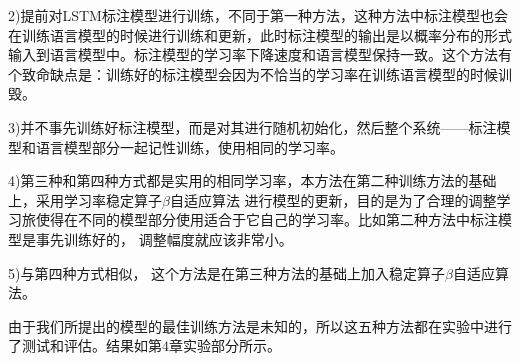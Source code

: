 2)提前对LSTM标注模型进行训练，不同于第一种方法，这种方法中标注模型也会在训练语言模型的时候进行训练和更新，此时标注模型的输出是以概率分布的形式输入到语言模型中。标注模型的学习率下降速度和语言模型保持一致。这个方法有个致命缺点是：训练好的标注模型会因为不恰当的学习率在训练语言模型的时候训毁。

3)并不事先训练好标注模型，而是对其进行随机初始化，然后整个系统——标注模型和语言模型部分一起记性训练，使用相同的学习率。 


4)第三种和第四种方式都是实用的相同学习率，本方法在第二种训练方法的基础上，采用学习率稳定算子$\beta$自适应算法 \cite{Ghahremani2016Self}\cite{Liu2016investigation} 进行模型的更新，目的是为了合理的调整学习旅使得在不同的模型部分使用适合于它自己的学习率。比如第二种方法中标注模型是事先训练好的， 调整幅度就应该非常小。 

5)与第四种方式相似， 这个方法是在第三种方法的基础上加入稳定算子$\beta$自适应算法。

由于我们所提出的模型的最佳训练方法是未知的，所以这五种方法都在实验中进行了测试和评估。结果如第$4$章实验部分所示。






